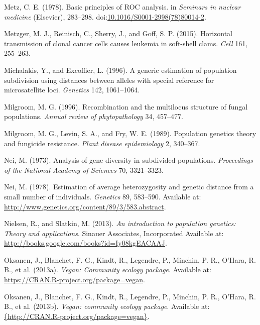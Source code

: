 \documentclass[double,12pt]{beavtex}
\begin{document}
  \hypertarget{ref-metz1978basic}{}
  Metz, C. E. (1978). Basic principles of ROC analysis. in \emph{Seminars
  in nuclear medicine} (Elsevier), 283--298.
  doi:\href{https://doi.org/10.1016/S0001-2998(78)80014-2}{10.1016/S0001-2998(78)80014-2}.
  
  \hypertarget{ref-metzger2015horizontal}{}
  Metzger, M. J., Reinisch, C., Sherry, J., and Goff, S. P. (2015).
  Horizontal transmission of clonal cancer cells causes leukemia in
  soft-shell clams. \emph{Cell} 161, 255--263.
  
  \hypertarget{ref-michalakis1996generic}{}
  Michalakis, Y., and Excoffier, L. (1996). A generic estimation of
  population subdivision using distances between alleles with special
  reference for microsatellite loci. \emph{Genetics} 142, 1061--1064.
  
  \hypertarget{ref-milgroom1996recombination}{}
  Milgroom, M. G. (1996). Recombination and the multilocus structure of
  fungal populations. \emph{Annual review of phytopathology} 34, 457--477.
  
  \hypertarget{ref-milgroom1989population}{}
  Milgroom, M. G., Levin, S. A., and Fry, W. E. (1989). Population
  genetics theory and fungicide resistance. \emph{Plant disease
  epidemiology} 2, 340--367.
  
  \hypertarget{ref-nei1973analysis}{}
  Nei, M. (1973). Analysis of gene diversity in subdivided populations.
  \emph{Proceedings of the National Academy of Sciences} 70, 3321--3323.
  
  \hypertarget{ref-Nei:1978}{}
  Nei, M. (1978). Estimation of average heterozygosity and genetic
  distance from a small number of individuals. \emph{Genetics} 89,
  583--590. Available at:
  \url{http://www.genetics.org/content/89/3/583.abstract}.
  
  \hypertarget{ref-nielsen2013introduction}{}
  Nielsen, R., and Slatkin, M. (2013). \emph{An introduction to population
  genetics: Theory and applications}. Sinauer Associates, Incorporated
  Available at: \url{http://books.google.com/books?id=Iy08kgEACAAJ}.
  
  \hypertarget{ref-oksanen2013vegan}{}
  Oksanen, J., Blanchet, F. G., Kindt, R., Legendre, P., Minchin, P. R.,
  O'Hara, R. B., et al. (2013a). \emph{Vegan: Community ecology package}.
  Available at: \url{https://CRAN.R-project.org/package=vegan}.
  
  \hypertarget{ref-vegan}{}
  Oksanen, J., Blanchet, F. G., Kindt, R., Legendre, P., Minchin, P. R.,
  O'Hara, R. B., et al. (2013b). \emph{Vegan: community ecology package}.
  Available at:
  \href{\%7Bhttp://CRAN.R-project.org/package=vegan\%7D}{\{http://CRAN.R-project.org/package=vegan\}}.
  
\end{document}

